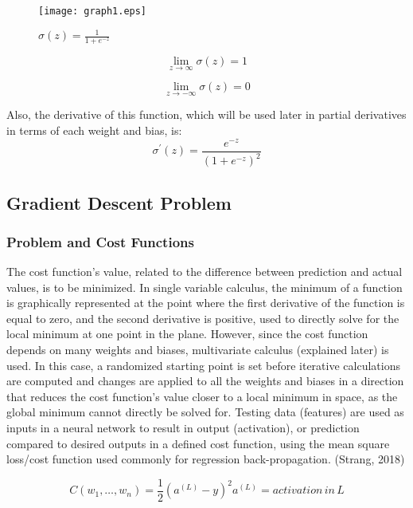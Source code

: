 \documentclass[12pt,a4paper]{article}
\begin{document}
\begin{figure}[h]
    \centering
    \texttt{[image: graph1.eps]}
    \caption{$\sigma\left(z\right)=\frac{1}{1+e^{-z}}	$}
    \label{fig:my_label}
\end{figure}

\begin{equation}
\lim_{z \to \infty}{\sigma\left(z\right)=1}
\end{equation}

\begin{equation}
\lim_{z\to -\infty}{\sigma\left(z\right)=0}
\end{equation}

Also, the derivative of this function, which will be used later in partial derivatives in terms of each weight and bias, is:
\begin{equation}
\sigma^\prime\left(z\right)=\frac{e^{-z}}{\left(1+e^{-z}\right)^2}
\end{equation}



\subsection{Gradient Descent Problem}
\subsubsection{Problem and Cost Functions}
The cost function’s value, related to the difference between prediction and actual values, is to be minimized. In single variable calculus, the minimum of a function is graphically represented at the point where the first derivative of the function is equal to zero, and the second derivative is positive, used to directly solve for the local minimum at one point in the plane. However, since the cost function depends on many weights and biases, multivariate calculus (explained later) is used. In this case, a randomized starting point is set before iterative calculations are computed and changes are applied to all the weights and biases in a direction that reduces the cost function’s value closer to a local minimum in space, as the global minimum cannot directly be solved for. Testing data (features) are used as inputs in a neural network to result in output (activation), or prediction compared to desired outputs in a defined cost function, using the mean square loss/cost function used commonly for regression back-propagation. (Strang, 2018)

\begin{equation}
C\left(w_1,\ldots,w_n\right)= \frac{1}{2}\left(a^{\left(L\right)}-y\right)^2
a^{\left(L\right)} = activation \,in\, L
\end{equation}
\end{document}
